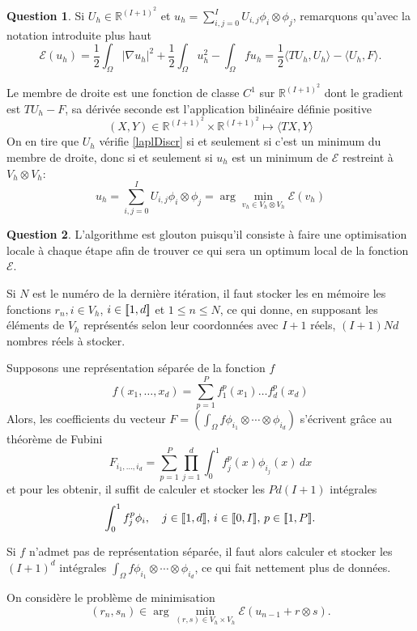 \documentclass[11pt]{article}
\newcommand{\RR}{\mathbb{R}}
\DeclarePairedDelimiter{\zintcc}{[\![}{]\!]}
\theoremstyle{definition}
\newtheorem{ques}{Question}
\begin{document}
\begin{ques}
Si $U_h\in \RR^{(I+1)^2}$ et $u_h = \sum_{i,j=0}^I U_{i,j}\phi_i\otimes\phi_j$, remarquons qu'avec la notation introduite plus haut
\[
\mathcal{E}(u_h) = \frac 12\int_\Omega |\nabla u_h|^2 + \frac 12\int_\Omega u_h^2 - \int_\Omega fu_h = \frac 12\langle TU_h,U_h\rangle - \langle U_h,F\rangle.
\]

Le membre de droite est une fonction de classe $C^1$ sur $\RR^{(I+1)^2}$ dont le gradient est $TU_h - F$, sa dérivée seconde est l'application bilinéaire définie positive
\[
(X,Y)\in \RR^{(I+1)^2}\times \RR^{(I+1)^2} \longmapsto \langle TX,Y\rangle
\]
On en tire que $U_h$ vérifie \eqref{laplDiscr} si et seulement si c'est un minimum du membre de droite, donc si et seulement si $u_h$ est un minimum de $\mathcal{E}$ restreint à $V_h\otimes V_h$:
\begin{equation}
u_h = \sum_{i,j=0}^I U_{i,j}\phi_i\otimes\phi_j = \arg\min_{v_h\in V_h\otimes V_h}\mathcal{E}(v_h)
\end{equation}
\end{ques}


\begin{ques}
L'algorithme est glouton puisqu'il consiste à faire une optimisation locale à chaque étape afin de trouver ce qui sera un optimum local de la fonction $\mathcal E$.

Si $N$ est le numéro de la dernière itération, il faut stocker les en mémoire les fonctions $r_n,i\in V_h$, $i\in\zintcc{1,d}$ et $1\leq n\leq N$, ce qui donne, en supposant les éléments de $V_h$ représentés selon leur coordonnées avec $I+1$ réels, $(I+1)Nd$ nombres réels à stocker.

Supposons une représentation séparée de la fonction $f$
\[
f(x_1,\ldots,x_d) = \sum_{p=1}^{P} f_1^p(x_1)\ldots f_d^p(x_d)
\]
Alors, les coefficients du vecteur $F = (\int_\Omega f\phi_{i_1}\otimes\cdots\otimes\phi_{i_d})$ s'écrivent grâce au théorème de Fubini
\[
F_{i_1,\ldots,i_d} = \sum_{p=1}^P\prod_{j=1}^{d}\int_0^1 f_j^p(x)\phi_{i_j}(x)\,dx
\]
et pour les obtenir, il suffit de calculer et stocker les $Pd(I+1)$ intégrales
\[
\int_0^1 f_j^p\phi_i,\quad j\in\zintcc{1,d},\,i\in\zintcc{0,I},\,p\in\zintcc{1,P}.
\]

Si $f$ n'admet pas de représentation séparée, il faut alors calculer et stocker les $(I+1)^d$ intégrales $\int_\Omega f\phi_{i_1}\otimes\cdots\otimes\phi_{i_d}$, ce qui fait nettement plus de données.
\end{ques}

On considère le problème de minimisation
\begin{equation}
(r_n,s_n) \in \arg\min_{(r,s)\in V_h\times V_h} \mathcal{E}(u_{n-1}+r\otimes s).
\end{equation}
\end{document}
